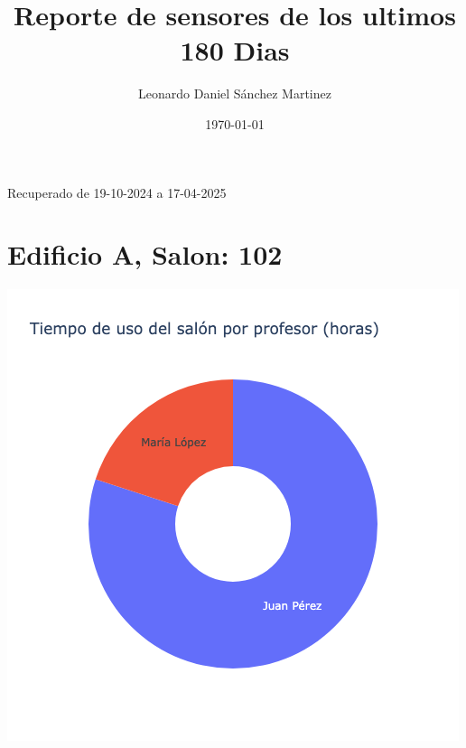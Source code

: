\documentclass{article}
\title{Reporte de sensores de los ultimos 180 Dias}
\author{Leonardo Daniel Sánchez Martinez}
\date{\today}
\begin{document}
    \maketitle
    Recuperado de 19-10-2024 a 17-04-2025

    \section{Edificio A, Salon: 102}
    \noindent
    \begin{minipage}{0.48\textwidth}
        \centering
        \includegraphics[width=\textwidth]{../img/pie/UP102-180Dias-17-04-2025.png}
    \end{minipage}
    \hfill
\end{document}
